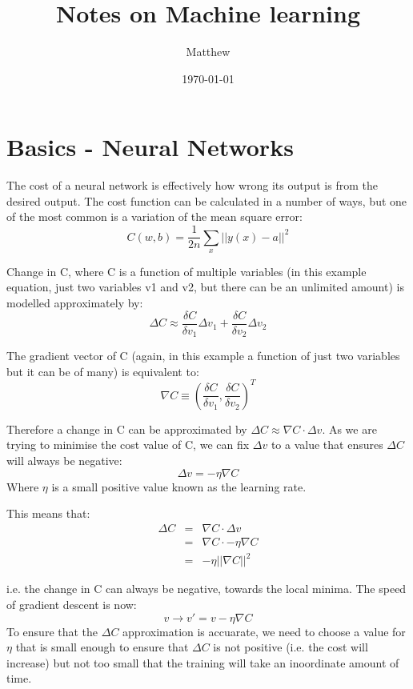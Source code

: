 \documentclass[a4paper,12pt]{article}
\begin{document}
\title{Notes on Machine learning}
\author{Matthew}
\date{\today}
\maketitle


\section{Basics - Neural Networks}

The cost of a neural network is effectively how wrong its output is from the desired output. The cost function can be calculated in a number of ways, but one of the most common is a variation of the mean square error: $$C(w,b)=\frac{1}{2n}\sum_x||y(x)-a||^2$$

\noindent Change in C, where C is a function of multiple variables (in this example equation, just two variables v1 and v2, but there can be an unlimited amount) is modelled approximately by: $$\Delta C\approx \frac{\delta C}{\delta v_1}\Delta v_1+\frac{\delta C}{\delta v_2}\Delta v_2$$

\noindent The gradient vector of C (again, in this example a function of just two variables but it can be of many) is equivalent to: $$\nabla C\equiv \left(\frac{\delta C}{\delta v_1},\frac{\delta C}{\delta v_2}\right)^T$$

\noindent Therefore a change in C can be approximated by $\Delta C\approx \nabla C \cdot \Delta v$. As we are trying to minimise the cost value of C, we can fix $\Delta v$ to a value that ensures $\Delta C$ will always be negative: $$\Delta v=-\eta \nabla C$$ Where $\eta$ is a small positive value known as the learning rate.

\noindent This means that:
\begin{eqnarray*}
	\Delta C & = & \nabla C\cdot \Delta v \\
	& = & \nabla C \cdot -\eta \nabla C \\
	& = & -\eta || \nabla C ||^2
\end{eqnarray*}

i.e. the change in C can always be negative, towards the local minima. The speed of gradient descent is now:$$v \rightarrow v'=v-\eta \nabla C$$ To ensure that the $\Delta C$ approximation is accuarate, we need to choose a value for $\eta$ that is small enough to ensure that $\Delta C$ is not positive (i.e. the cost will increase) but not too small that the training will take an inoordinate amount of time.
\end{document}

